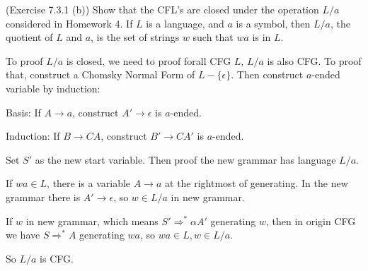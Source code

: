 \documentclass[10pt]{homework}
\begin{document}
\begin{problem} (Exercise 7.3.1 (b)) Show that the CFL’s are closed under the
  operation $L/a$ considered in Homework 4.
  If $L$ is a language, and $a$ is a symbol, then $L/a$, the quotient of $L$ and
  $a$, is the set of strings $w$ such that $wa$ is in $L$.
\end{problem}

\begin{solution}
    To proof $L/a$ is closed, we need to proof forall CFG $L$, $L / a$ is also CFG. To proof that, construct a Chomsky Normal Form of $L-\{\epsilon\}$. Then construct $a$-ended variable by induction:

    Basis: If $A\rightarrow a$, construct $A'\rightarrow \epsilon$ is $a$-ended.

    Induction: If $B\rightarrow CA$, construct $B'\rightarrow CA'$ is $a$-ended.

    Set $S'$ as the new start variable. Then proof the new grammar has language $L / a$.

    If $wa\in L$, there is a variable $A\rightarrow a$ at the rightmost of generating. In the new grammar there is $A'\rightarrow \epsilon$, so $w\in L / a$ in new grammar.

    If $w$ in new grammar, which means $S'\Rightarrow^{*} \alpha A'$ generating $w$, then in origin CFG we have $S\Rightarrow ^{*}A$ generating $wa$, so $wa\in L,w\in L / a$.

    So $L / a$ is CFG.
\end{solution}

\end{document}
